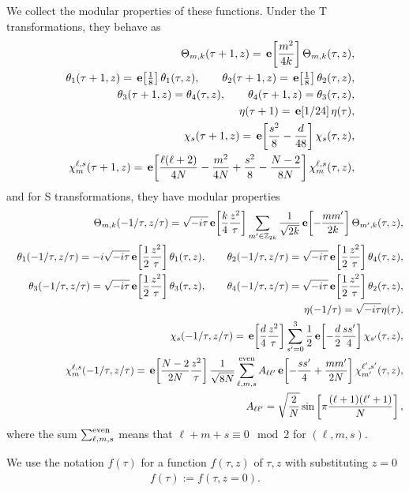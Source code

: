 \documentclass[a4paper,12pt]{article}
\numberwithin{equation}{section}
\newcommand{\Th}{\Theta}
\newcommand{\Zb}{{\mathbb Z}}
\newcommand{\e}[1]{\,{\bf e}\!\left[#1\right]}
\begin{document}
We collect the modular properties of these functions.
Under the T transformations, they behave as
\begin{eqnarray*}
 && \Th_{m,k}(\tau+1,z)=\e{\frac{m^2}{4k}}\Th_{m,k}(\tau,z),\\
 && \theta_1(\tau+1,z)=\e{\tfrac18}\theta_1(\tau,z), 
 \qquad \theta_2(\tau+1,z)=\e{\tfrac18}\theta_2(\tau,z),\\
 && \theta_3(\tau+1,z)=\theta_4(\tau,z), 
 \qquad \theta_4(\tau+1,z)=\theta_3(\tau,z),\\
 && \eta(\tau+1)=\e{1/24}\eta(\tau),\\
 && \chi_s(\tau+1,z)=\e{\frac{s^2}{8}-\frac{d}{48}}\chi_s(\tau,z),\\
 && \chi_m^{\ell,s}(\tau+1,z)=\e{\frac{\ell(\ell+2)}{4N}-\frac{m^2}{4N}
+\frac{s^2}{8}-\frac{N-2}{8N}}\chi_m^{\ell,s}(\tau,z),
\end{eqnarray*}
and for S transformations, they have modular properties
\begin{eqnarray*}
 &&\Th_{m,k}(-1/\tau,z/\tau)=
\sqrt{-i\tau}\e{\frac{k}{4}\frac{z^2}{\tau}}
\sum_{m'\in \Zb_{2k}}\frac{1}{\sqrt{2k}}\e{-\frac{mm'}{2k}}
\Th_{m',k}(\tau,z),\\
 &&\theta_1(-1/\tau,z/\tau)=-i\sqrt{-i\tau}\e{\frac12 \frac{z^2}{\tau}}
\theta_1(\tau,z),
\qquad \theta_2(-1/\tau,z/\tau)=\sqrt{-i\tau}\e{\frac12 \frac{z^2}{\tau}}
\theta_4(\tau,z),\\
 &&\theta_3(-1/\tau,z/\tau)=\sqrt{-i\tau}\e{\frac12 \frac{z^2}{\tau}}
\theta_3(\tau,z),
\qquad \theta_4(-1/\tau,z/\tau)=\sqrt{-i\tau}\e{\frac12 \frac{z^2}{\tau}}
\theta_2(\tau,z),\\
&& \eta(-1/\tau)=\sqrt{-i\tau}\eta(\tau),\\
&&\chi_s(-1/\tau,z/\tau)=\e{\frac{d}{4}\frac{z^2}{\tau}}
\sum_{s'=0}^{3}\frac 12 \e{-\frac d2 \frac{ss'}{4}}\chi_{s'}(\tau,z),\\
 && \chi_m^{\ell,s}(-1/\tau,z/\tau)=
\e{\frac{N-2}{2N}\frac{z^2}{\tau}}
\frac{1}{\sqrt{8N}} \sum_{\ell,m,s}^{\rm even}
A_{\ell\ell'}\e{-\frac{ss'}{4}+\frac{mm'}{2N}}
\chi_{m'}^{\ell',s'}(\tau,z),\\
&&A_{\ell\ell'}=\sqrt{\frac2N}\sin\left[\pi\frac{(\ell+1)(\ell'+1)}{N}\right],
\end{eqnarray*}
where the sum $\sum_{\ell,m,s}^{\rm even}$ means that 
 $\ell+m+s \equiv 0\mod 2$ for $(\ell,m,s)$.

We use the notation $f(\tau)$ for a function $f(\tau,z)$
of $\tau,z$ with substituting $z=0$
\begin{eqnarray*}
 f(\tau):=f(\tau,z=0).
\end{eqnarray*}
\end{document}
